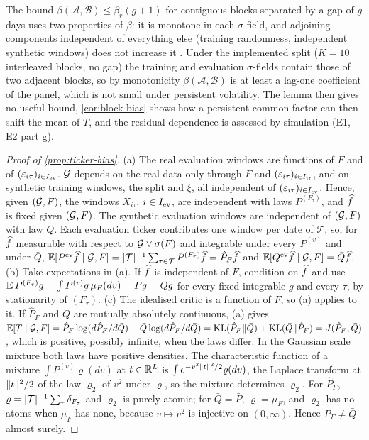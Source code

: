 The bound $\beta(\mathcal A,\mathcal B)\le\beta_r(g+1)$ for contiguous blocks separated by a
gap of $g$ days uses two properties of $\beta$: it is monotone in each $\sigma$-field, and
adjoining components independent of everything else (training randomness, independent synthetic
windows) does not increase it \citep[Thm.~6.2]{bradley_2005_basic}. Under the implemented split
($K=10$ interleaved blocks, no gap) the training and evaluation $\sigma$-fields contain those of
two adjacent blocks, so by monotonicity $\beta(\mathcal A,\mathcal B)$ is at least a lag-one
coefficient of the panel, which is not small under persistent volatility. The lemma then gives no
useful bound, \cref{cor:block-bias} shows how a persistent common factor can then shift the mean
of $T$, and the residual dependence is assessed by simulation (E1, E2 part g).

\begin{proof}[Proof of \cref{prop:ticker-bias}]
(a) The real evaluation windows are functions of $F$ and of $(\varepsilon_{i\tau})_{i\in I_{\mathrm{ev}}}$.
$\mathcal{G}$ depends on the real data only through $F$ and $(\varepsilon_{i\tau})_{i\in I_{\mathrm{tr}}}$, and on
synthetic training windows, the split and $\xi$, all independent of
$(\varepsilon_{i\tau})_{i\in I_{\mathrm{ev}}}$. Hence, given $(\mathcal{G},F)$, the windows $X_{i\tau}$, $i\in I_{\mathrm{ev}}$,
are independent with laws $P^{(F_\tau)}$, and $\widehat{f}$ is fixed given $(\mathcal{G},F)$. The synthetic
evaluation windows are independent of $(\mathcal{G},F)$ with law $\bar Q$. Each evaluation ticker contributes one window per date of
$\mathcal T$, so, for $\widehat{f}$ measurable with respect to $\mathcal{G}\vee\sigma(F)$ and integrable under
every $P^{(v)}$ and under $\bar Q$,
$\mathbb{E}[P^{\mathrm{ev}}\widehat{f}\mid\mathcal{G},F]=\lvert\mathcal T\rvert^{-1}\sum_{\tau\in\mathcal T}P^{(F_\tau)}\widehat{f}=\hat P_F\widehat{f}$ and
$\mathbb{E}[Q^{\mathrm{ev}}\widehat{f}\mid\mathcal{G},F]=\bar Q\widehat{f}$.
(b) Take expectations in (a). If $\widehat{f}$ is independent of $F$, condition on $\widehat{f}$ and use
$\mathbb{E}\,P^{(F_\tau)}g=\int P^{(v)}g\,\mu_F(dv)=\bar Pg=\bar Qg$ for every fixed integrable $g$ and every
$\tau$, by stationarity of $(F_\tau)$.
(c) The idealised critic is a function of $F$, so (a) applies to it. If $\hat P_F$ and $\bar Q$
are mutually absolutely continuous, (a) gives
$\mathbb{E}[T\mid\mathcal{G},F]=\hat P_F\log(d\hat P_F/d\bar Q)-\bar Q\log(d\hat P_F/d\bar Q)
=\operatorname{KL}(\hat P_F\Vert\bar Q)+\operatorname{KL}(\bar Q\Vert\hat P_F)=J(\hat P_F,\bar Q)$, which is positive,
possibly infinite, when the laws differ. In the Gaussian scale mixture both laws have positive densities. The characteristic
function of a mixture $\int P^{(v)}\varrho(dv)$ at $t\in\mathbb{R}^L$ is
$\int e^{-v^2\lVert t\rVert^2/2}\varrho(dv)$, the Laplace transform at $\lVert t\rVert^2/2$ of the law $\varrho_2$
of $v^2$ under $\varrho$, so the mixture determines $\varrho_2$. For $\hat P_F$,
$\varrho=\lvert\mathcal T\rvert^{-1}\sum_\tau\delta_{F_\tau}$ and $\varrho_2$ is purely atomic; for
$\bar Q=\bar P$, $\varrho=\mu_F$, and $\varrho_2$ has no atoms when $\mu_F$ has none, because
$v\mapsto v^2$ is injective on $(0,\infty)$. Hence $\hat P_F\neq\bar Q$ almost surely.
\end{proof}

